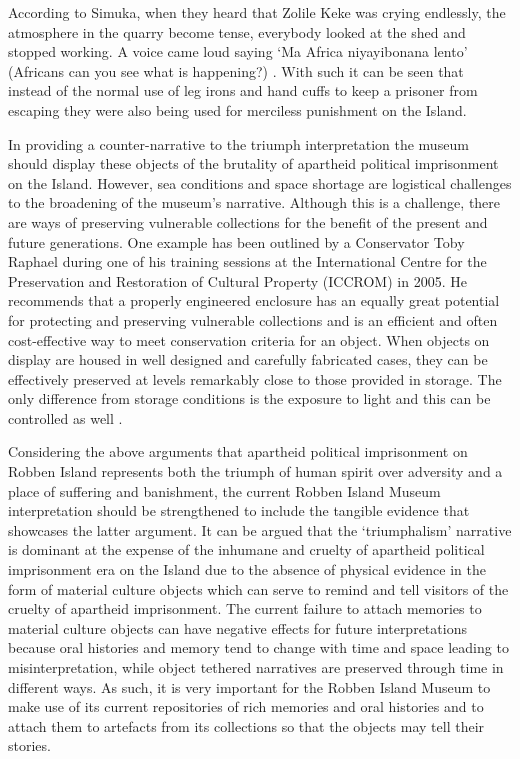 According to Simuka, when they heard that Zolile Keke was crying endlessly, the atmosphere in the quarry become tense, everybody looked at the shed and stopped working. A voice came loud saying ‘Ma Africa niyayibonana lento’ (Africans can you see what is happening?) \parencite{Robben_2003}. With such it can be seen that instead of the normal use of leg irons and hand cuffs to keep a prisoner from escaping they were also being used for merciless punishment on the Island.


In providing a counter-narrative to the triumph interpretation the museum should display these objects of the brutality of apartheid political imprisonment on the Island. However, sea conditions and space shortage are logistical challenges to the broadening of the museum’s narrative. Although this is a challenge, there are ways of preserving vulnerable collections for the benefit of the present and future generations. One example has been outlined by a Conservator Toby Raphael during one of his training sessions at the International Centre for the Preservation and Restoration of Cultural Property (ICCROM) in 2005. He recommends that a properly engineered enclosure has an equally great potential for protecting and preserving vulnerable collections and is an efficient and often cost-effective way to meet conservation criteria for an object. When objects on display are housed in well designed and carefully fabricated cases, they can be effectively preserved at levels remarkably close to those provided in storage. The only difference from storage conditions is the exposure to light and this can be controlled as well \parencite[245--257]{Rafael_2005}.


Considering the above arguments that apartheid political imprisonment on Robben Island represents both the triumph of human spirit over adversity and a place of suffering and banishment, the current Robben Island Museum interpretation should be strengthened to include the tangible evidence that showcases the latter argument. It can be argued that the ‘triumphalism’ narrative is dominant at the expense of the inhumane and cruelty of apartheid political imprisonment era on the Island due to the absence of physical evidence in the form of material culture objects which can serve to remind and tell visitors of the cruelty of apartheid imprisonment. The current failure to attach memories to material culture objects can have negative effects for future interpretations because oral histories and memory tend to change with time and space leading to misinterpretation, while object tethered narratives are preserved through time in different ways. As such, it is very important for the Robben Island Museum to make use of its current repositories of rich memories and oral histories and to attach them to artefacts from its collections so that the objects may tell their stories.

\IJSRAclosing%
